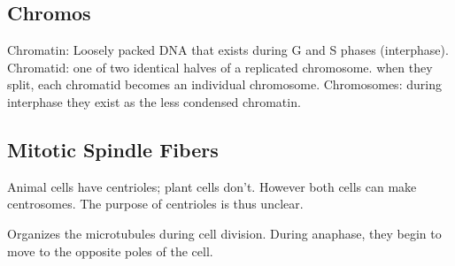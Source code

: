\documentclass[12pt]{article}
\begin{document}
\subsection{Chromos}
Chromatin: Loosely packed DNA that exists during G and S phases (interphase).
Chromatid: one of two identical halves of a replicated chromosome. when
they split, each chromatid becomes an individual chromosome.
Chromosomes: during interphase they exist as the less condensed
chromatin. 

\subsection{Mitotic Spindle Fibers}
Animal cells have centrioles; plant cells don't. However
both cells can make centrosomes. The purpose of centrioles is thus
unclear. 
\begin{definition}[Centrosome]
    Organizes the microtubules during cell division. During anaphase,
    they begin to move to the opposite poles of the cell. 
\end{definition}
\end{document}
